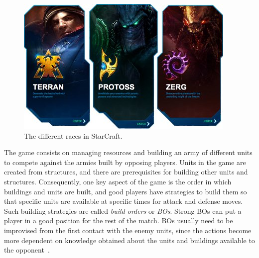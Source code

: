 \begin{figure}[H]
\centering
\includegraphics[width=400px]{images/sc-races}
\caption{The different races in StarCraft.}
\label{fig:sc-races}
\end{figure}

The game consists on managing resources and building an army of different units to compete against the armies built by opposing players. 
Units in the game are created from structures, and there are prerequisites for building other units and structures. 
Consequently, one key aspect of the game is the order in which buildings and units are built, and good players have strategies to build them so that specific units are available at specific times for attack and defense moves. 
Such building strategies are called \textit{build orders} or \textit{BOs}. 
Strong BOs can put a player in a good position for the rest of the match.
BOs usually need to be improvised from the first contact with the enemy units, since the actions become more dependent on knowledge obtained about the units and buildings available to the opponent~\cite{hagelback2012potential,churchill2011build}.